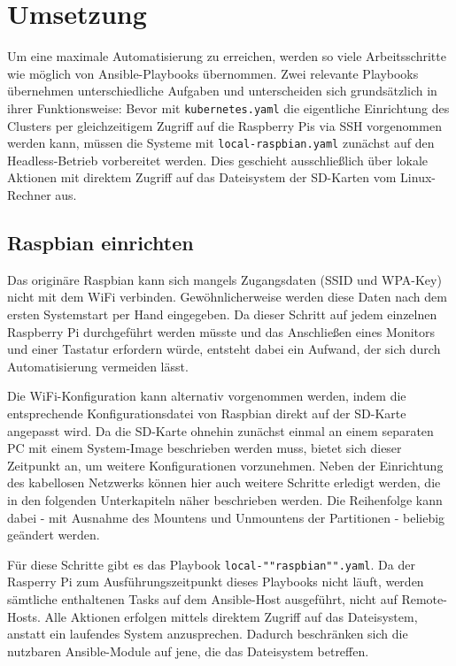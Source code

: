 \chapter{Umsetzung}\label{ch:umsetzung}

Um eine maximale Automatisierung zu erreichen, werden so viele Arbeitsschritte wie möglich von Ansible-Playbooks übernommen.
Zwei relevante Playbooks übernehmen unterschiedliche Aufgaben und unterscheiden sich grundsätzlich in ihrer Funktionsweise:
Bevor mit \texttt{kubernetes.yaml} die eigentliche Einrichtung des Clusters per gleichzeitigem Zugriff auf die Raspberry Pis via SSH vorgenommen werden kann, müssen die Systeme mit \texttt{local-raspbian.yaml} zunächst auf den Headless-Betrieb vorbereitet werden.
Dies geschieht ausschließlich über lokale Aktionen mit direktem Zugriff auf das Dateisystem der SD-Karten vom Linux-Rechner aus.

\section{Raspbian einrichten}\label{sec:raspbian-einrichten}

Das originäre Raspbian kann sich mangels Zugangsdaten (SSID und WPA-Key) nicht mit dem WiFi verbinden.
Gewöhnlicherweise werden diese Daten nach dem ersten Systemstart per Hand eingegeben.
Da dieser Schritt auf jedem einzelnen Raspberry Pi durchgeführt werden müsste und das Anschließen eines Monitors und einer Tastatur erfordern würde, entsteht dabei ein Aufwand, der sich durch Automatisierung vermeiden lässt.

Die WiFi-Konfiguration kann alternativ vorgenommen werden, indem die entsprechende Konfigurationsdatei von Raspbian direkt auf der SD-Karte angepasst wird.
Da die SD-Karte ohnehin zunächst einmal an einem separaten PC mit einem System-Image beschrieben werden muss, bietet sich dieser Zeitpunkt an, um weitere Konfigurationen vorzunehmen.
Neben der Einrichtung des kabellosen Netzwerks können hier auch weitere Schritte erledigt werden, die in den folgenden Unterkapiteln näher beschrieben werden.
Die Reihenfolge kann dabei - mit Ausnahme des Mountens und Unmountens der Partitionen - beliebig geändert werden.

Für diese Schritte gibt es das Playbook \texttt{local-""raspbian"".yaml}.
Da der Rasperry Pi zum Ausführungszeitpunkt dieses Playbooks nicht läuft, werden sämtliche enthaltenen Tasks auf dem Ansible-Host ausgeführt, nicht auf Remote-Hosts.
Alle Aktionen erfolgen mittels direktem Zugriff auf das Dateisystem, anstatt ein laufendes System anzusprechen.
Dadurch beschränken sich die nutzbaren Ansible-Module auf jene, die das Dateisystem betreffen.

